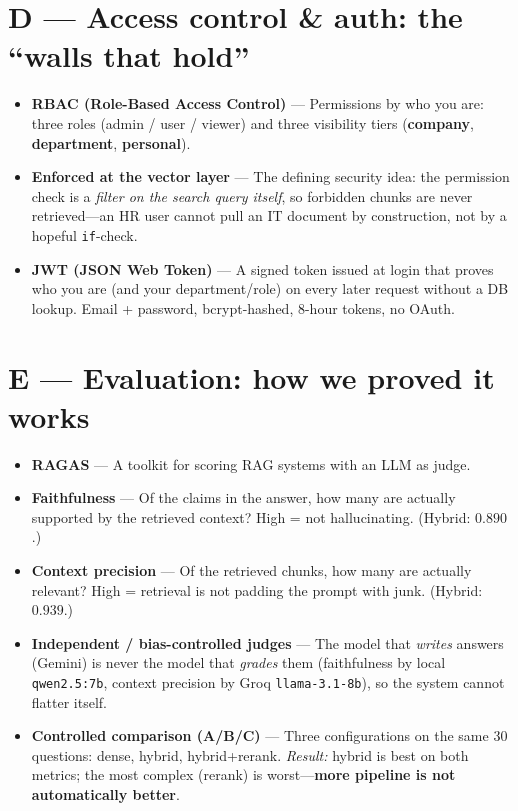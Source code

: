 \documentclass[11pt,a4paper,oneside]{report}
\newcommand{\code}[1]{\texttt{#1}}
\begin{document}
\section{D --- Access control \& auth: the ``walls that hold''}
\begin{itemize}
  \item \textbf{RBAC (Role-Based Access Control)} --- Permissions by who you are: three roles (admin /
  user / viewer) and three visibility tiers (\textbf{company}, \textbf{department}, \textbf{personal}).
  \item \textbf{Enforced at the vector layer} --- The defining security idea: the permission check is a
  \emph{filter on the search query itself}, so forbidden chunks are never retrieved---an HR user cannot
  pull an IT document by construction, not by a hopeful \code{if}-check.
  \item \textbf{JWT (JSON Web Token)} --- A signed token issued at login that proves who you are (and your
  department/role) on every later request without a DB lookup. Email + password, bcrypt-hashed, 8-hour
  tokens, no OAuth.
\end{itemize}

\section{E --- Evaluation: how we proved it works}
\begin{itemize}
  \item \textbf{RAGAS} --- A toolkit for scoring RAG systems with an LLM as judge.
  \item \textbf{Faithfulness} --- Of the claims in the answer, how many are actually supported by the
  retrieved context? High = not hallucinating. (Hybrid: $0.890$.)
  \item \textbf{Context precision} --- Of the retrieved chunks, how many are actually relevant? High =
  retrieval is not padding the prompt with junk. (Hybrid: $0.939$.)
  \item \textbf{Independent / bias-controlled judges} --- The model that \emph{writes} answers (Gemini) is
  never the model that \emph{grades} them (faithfulness by local \code{qwen2.5:7b}, context precision by
  Groq \code{llama-3.1-8b}), so the system cannot flatter itself.
  \item \textbf{Controlled comparison (A/B/C)} --- Three configurations on the same 30 questions: dense,
  hybrid, hybrid+rerank. \emph{Result:} hybrid is best on both metrics; the most complex (rerank) is
  worst---\textbf{more pipeline is not automatically better}.
\end{itemize}
\end{document}
